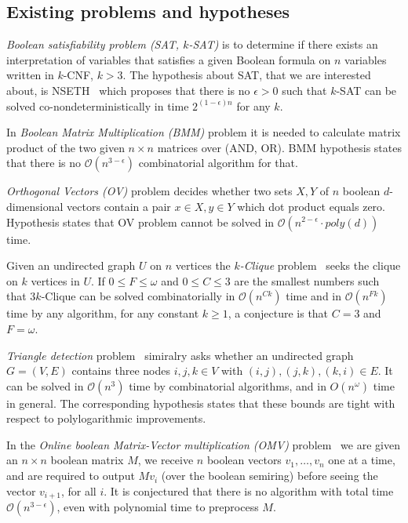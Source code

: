 \documentclass[acmsmall,nonacm]{acmart}
\begin{document}
	\subsection{Existing problems and hypotheses}
	
	
	\emph{Boolean satisfiability problem (SAT, $k$-SAT)} is to determine if there exists an interpretation of variables that satisfies a given Boolean formula on $n$ variables written in $k$-CNF, $k > 3$. The hypothesis about SAT, that we are interested about, is NSETH~\cite{10.1145/2840728.2840746} which proposes that there is no $\epsilon > 0$ such that $k$-SAT can be solved co-nondeterministically in time $2^{(1 - \epsilon) n}$ for any $k$.
	
	In \emph{Boolean Matrix Multiplication (BMM)} problem it is needed to calculate matrix product of the two given $n \times n$ matrices over (AND, OR). BMM hypothesis states that there is no $\mathcal{O}(n^{3 - \epsilon})$ combinatorial algorithm for that. 
	
	\emph{Orthogonal Vectors (OV)} problem decides whether two sets $X, Y$ of $n$ boolean $d$-dimensional vectors contain a pair $x \in X, y \in Y$ which dot product equals zero. Hypothesis states that OV problem cannot be solved in $\mathcal{O}(n^{2 - \epsilon} \cdot poly(d))$ time. 
	
	Given an undirected graph $U$ on $n$ vertices the \emph{$k$-Clique} problem~\cite{abboud2018if} seeks the clique on $k$ vertices in $U$.  If $0 \leq F \leq \omega$ and $0 \leq C \leq 3$ are the smallest numbers such that $3k$-Clique can be solved combinatorially in $\mathcal{O}(n^{Ck})$ time and in $\mathcal{O}(n^{Fk})$ time by any algorithm, for any constant $k \geq 1$, a conjecture is that $C = 3$ and $F = \omega$.
	
	\emph{Triangle detection} problem~\cite{hansen2021tight} simiralry asks whether an undirected graph $G = (V , E)$ contains three nodes $i, j, k \in V$ with $(i,j),(j,k),(k,i) \in E$. It can be solved in $\mathcal{O}(n^3)$ time by combinatorial algorithms, and in $O(n^{\omega})$ time in general. The corresponding hypothesis states that these bounds are tight with respect to polylogarithmic improvements.
	
	In the \emph{Online boolean Matrix-Vector multiplication (OMV)} problem~\cite{10.1145/2746539.2746609} we are given an $n \times n$ boolean matrix $M$, we receive $n$ boolean vectors $v_1, \ldots, v_n$ one at a time, and are required to output $Mv_i$ (over the boolean semiring) before seeing the vector $v_{i+1}$, for all $i$. It is conjectured that there is no algorithm with total time $\mathcal{O}(n^{3-\epsilon})$, even with polynomial time to preprocess $M$.
	
\end{document}
